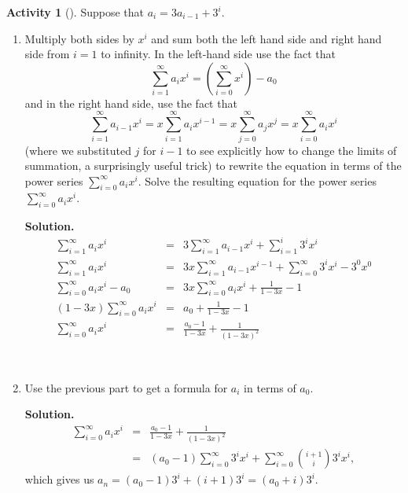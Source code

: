 \documentclass[10pt,]{book}
\theoremstyle{plain}
\theoremstyle{definition}
\newtheorem{activity}[project]{Activity}
\numberwithin{equation}{chapter}
\newcommand{\amp}{&}
\begin{document}
\begin{activity}[]\label{substituteandsolve}
Suppose that \(a_i=3a_{i-1} + 3^i\).%
~\par
\begin{enumerate}[label=(\alph*)]
 \item Multiply both sides by \(x^i\) and sum both the left hand side and right hand side from \(i=1\) to infinity.  In the left-hand side use the fact that%
\begin{equation*}
\sum_{i=1}^\infty a_ix^i = (\sum_{i=0}^\infty x^i) -a_0
\end{equation*}
and in the right hand side, use the fact that%
\begin{equation*}
\sum_{i=1}^\infty a_{i-1}x^i = x\sum_{i=1}^\infty a_ix^{i-1}
=x\sum_{j=0}^\infty a_jx^j =x\sum_{i=0}^\infty a_ix^i
\end{equation*}
(where we substituted \(j\) for \(i-1\) to see explicitly how to change the limits of summation, a surprisingly useful trick) to rewrite the equation in terms of the power series \(\sum_{i=0}^\infty a_ix^i\).  Solve the resulting equation for the power series \(\sum_{i=0}^\infty a_ix^i\).%
\par\medskip\noindent%
\textbf{Solution.}\quad %
\begin{align*}
\sum_{i=1}^\infty a_ix^i \amp =\amp 3\sum_{i=1}^\infty
a_{i-1}x^i+\sum_{i=1}^i3^ix^i\\
\sum_{i=1}^\infty a_ix^i\amp =\amp 3x\sum_{i=1}^\infty a_{i-1}x^{i-1}+
\sum_{i=0}^\infty 3^ix^i-3^0x^0\\
\sum_{i=0}^\infty a_ix^i -a_0\amp =\amp 3x\sum_{i=0}^\infty a_{i}x^{i}+
\frac{1}{1-3x}-1\\
(1-3x)\sum_{i=0}^\infty a_ix^i \amp =\amp a_0+\frac{1}{1-3x} -1\\
\sum_{i=0}^\infty a_ix^i \amp =\amp \frac{a_0-1}{1-3x}+\frac{1}{(1-3x)^2}
\end{align*}
%

~\par
\item Use the previous part to get a formula for \(a_i\) in terms of \(a_0\).%
\par\medskip\noindent%
\textbf{Solution.}\quad %
\begin{align*}
\sum_{i=0}^\infty a_i x^i \amp =\amp \frac{a_0-1}{1-3x} + \frac{1}{(1-3x)^2}\\
\amp =\amp (a_0-1)\sum_{i=0}^\infty 3^ix^i +\sum_{i=0}^\infty \binom{i+1}{i}3^ix^i,
\end{align*}
which gives us \(a_n=(a_0-1) 3^i + (i+1)3^i=(a_0+i)3^i\).%


\end{enumerate}
\end{activity}
\end{document}
